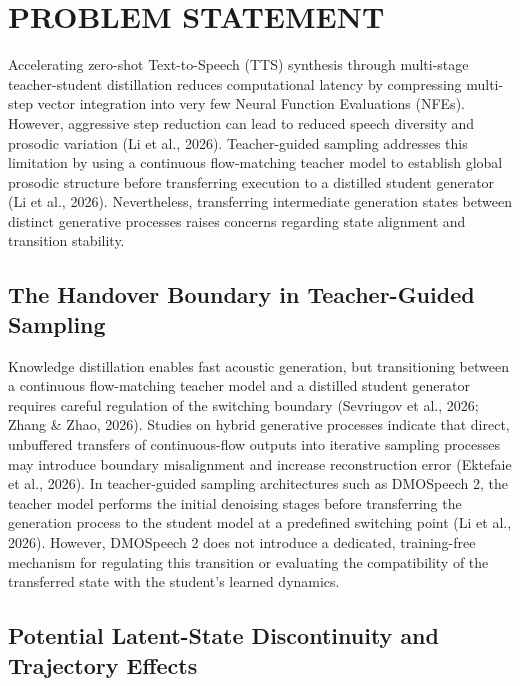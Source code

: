 \documentclass[12pt,a4paper,oneside]{report}
\begin{document}
\section{PROBLEM STATEMENT}

Accelerating zero-shot Text-to-Speech (TTS) synthesis through multi-stage teacher-student distillation reduces computational latency by compressing multi-step vector integration into very few Neural Function Evaluations (NFEs). However, aggressive step reduction can lead to reduced speech diversity and prosodic variation (Li et al., 2026). Teacher-guided sampling addresses this limitation by using a continuous flow-matching teacher model to establish global prosodic structure before transferring execution to a distilled student generator (Li et al., 2026). Nevertheless, transferring intermediate generation states between distinct generative processes raises concerns regarding state alignment and transition stability. 

\subsection{The Handover Boundary in Teacher-Guided Sampling}

Knowledge distillation enables fast acoustic generation, but transitioning between a continuous flow-matching teacher model and a distilled student generator requires careful regulation of the switching boundary (Sevriugov et al., 2026; Zhang \& Zhao, 2026). Studies on hybrid generative processes indicate that direct, unbuffered transfers of continuous-flow outputs into iterative sampling processes may introduce boundary misalignment and increase reconstruction error (Ektefaie et al., 2026). In teacher-guided sampling architectures such as DMOSpeech 2, the teacher model performs the initial denoising stages before transferring the generation process to the student model at a predefined switching point (Li et al., 2026). However, DMOSpeech 2 does not introduce a dedicated, training-free mechanism for regulating this transition or evaluating the compatibility of the transferred state with the student's learned dynamics.

\subsection{Potential Latent-State Discontinuity and Trajectory Effects}
\end{document}
